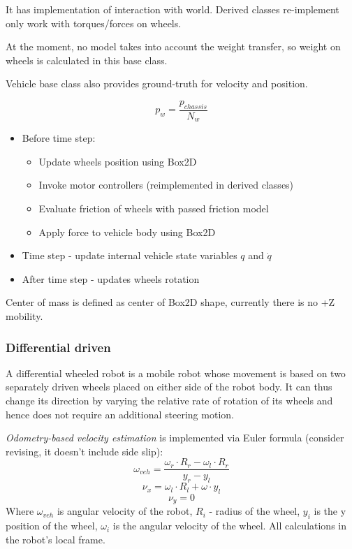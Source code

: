 \documentclass[a4paper,11pt]{article}
\begin{document}
It has implementation of interaction with world. Derived classes re-implement only work with torques/forces on wheels. 

At the moment, no model takes into account the weight transfer, so weight on wheels is calculated in this base class.

Vehicle base class also provides ground-truth for velocity and position. 
\begin{center}
\[
p_w = \frac{p_{chassis}}{N_w}
\]
\end{center}

\begin{itemize}
	\item Before time step:
	\begin{itemize}
		\item Update wheels position using Box2D
		\item Invoke motor controllers (reimplemented in derived classes)
		\item Evaluate friction of wheels with passed friction model
		\item Apply force to vehicle body using Box2D
	\end{itemize}
	\item Time step - update internal vehicle state variables $q$ and $\dot{q}$
	\item After time step - updates wheels rotation		
\end{itemize}

Center of mass is defined as center of Box2D shape, currently there is no +Z mobility. 
 
\subsubsection{Differential driven}

A differential wheeled robot is a mobile robot whose movement is based on two separately driven wheels placed on either side of the robot body. It can thus change its direction by varying the relative rate of rotation of its wheels and hence does not require an additional steering motion.

\textit{Odometry-based velocity estimation} is implemented via Euler formula (consider revising, it doesn't include side slip):
\[
\omega_{veh} = \frac{\omega_r \cdot R_r - \omega_l \cdot R_r}{y_r - y_l}
\]
\[
\nu_x = \omega_l \cdot R_l + \omega \cdot y_l
\]
\[
\nu_y = 0
\]
Where $\omega_{veh}$ is angular velocity of the robot, $R_i$ - radius of the wheel, $y_i$ is the y position of the wheel, $\omega_i$ is the angular velocity of the wheel. All calculations in the robot's local frame. 
\end{document}
